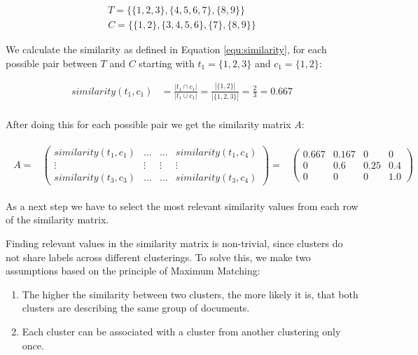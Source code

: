 \begin{gather*}
    T = \{\{1,2,3\},\{4,5,6,7\},\{8,9\}\} \\
    C = \{\{1,2\},\{3,4,5,6\},\{7\},\{8,9\}\}
\end{gather*}

We calculate the similarity as defined in Equation \eqref{equ:similarity},
for each possible pair between $T$ and $C$ starting with $t_1= \{1,2,3\}$ and $c_1 = \{1,2\}$:

\begin{align*}
    similarity(t_1,c_1) &=\frac{|t_1 \cap c_1|}{|t_1 \cup c_1|}
    = \frac{|\{1,2\}|}{|\{1,2,3\}|}
    = \frac{2}{3} = 0.667 \\
\end{align*}

After doing this for each possible pair we get the similarity matrix $A$:

\begin{gather*}
\begin{array}{rcl}
    A = & \left(\begin{array}{cccc}
        similarity(t_1,c_1) & \hdots & \hdots & similarity(t_1,c_4)\\
        \vdots & \vdots & \vdots & \vdots\\
        similarity(t_3,c_3) & \hdots & \hdots & similarity(t_3,c_4) \end{array}\right)
        = & \left(\begin{array}{cccc}
            0.667 & 0.167 & 0 & 0 \\
            0 & 0.6 & 0.25 & 0.4 \\
            0 &  0 & 0 & 1.0 \end{array}\right)
\end{array}
\end{gather*}

As a next step we have to select the most relevant similarity values from each row of the similarity matrix.

Finding relevant values in the similarity matrix is non-trivial,
since clusters do not share labels across different clusterings.
To solve this, we make two assumptions based on the principle of Maximum Matching:

\begin{enumerate}
    \item The higher the similarity between two clusters, the more likely it is, that both clusters are describing the same group of documents.
    \item Each cluster can be associated with a cluster from another clustering only once.
\end{enumerate}

